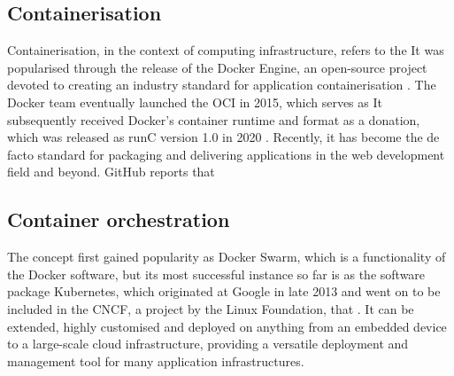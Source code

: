 \subsection{Containerisation}

Containerisation, in the context of computing infrastructure, refers to the  It was popularised through the release of the Docker Engine, an open-source project devoted to creating an industry standard for application containerisation \parencite{dockerRelease}. The Docker team eventually launched the \ac{OCI} in 2015, which serves as  It subsequently received Docker's container runtime and format as a donation, which was released as runC version 1.0 in 2020 \parencite{openContainerInitiative}. Recently, it has become the de facto standard for packaging and delivering applications in the web development field and beyond. GitHub reports that 

\subsection{Container orchestration}

 The concept first gained popularity as Docker Swarm, which is a functionality of the Docker software, but its most successful instance so far is as the software package Kubernetes, which originated at Google in late 2013 \parencite{kubernetesHistory} and went on to be included in the \ac{CNCF}, a project by the Linux Foundation, that . It can be extended, highly customised and deployed on anything from an embedded device to a large-scale cloud infrastructure, providing a versatile deployment and management tool for many application infrastructures.
